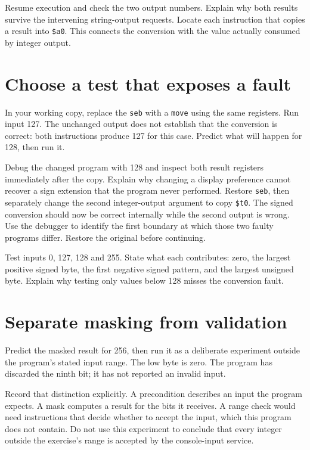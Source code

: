 Resume execution and check the two output numbers. Explain why both results
survive the intervening string-output requests. Locate each instruction that
copies a result into \texttt{\$a0}. This connects the conversion with the value
actually consumed by integer output.

\section{Choose a test that exposes a fault}

In your working copy, replace the \texttt{seb} with a \texttt{move} using the
same registers. Run input 127. The unchanged output does not establish that the
conversion is correct: both instructions produce 127 for this case. Predict what
will happen for 128, then run it.

Debug the changed program with 128 and inspect both result registers immediately
after the copy. Explain why changing a display preference cannot recover a sign
extension that the program never performed. Restore \texttt{seb}, then separately
change the second integer-output argument to copy \texttt{\$t0}. The signed
conversion should now be correct internally while the second output is wrong.
Use the debugger to identify the first boundary at which those two faulty
programs differ. Restore the original before continuing.

Test inputs 0, 127, 128 and 255. State what each contributes: zero, the largest
positive signed byte, the first negative signed pattern, and the largest unsigned
byte. Explain why testing only values below 128 misses the conversion fault.

\section{Separate masking from validation}

Predict the masked result for 256, then run it as a deliberate experiment outside
the program's stated input range. The low byte is zero. The program has discarded
the ninth bit; it has not reported an invalid input.

Record that distinction explicitly. A precondition describes an input the program
expects. A mask computes a result for the bits it receives. A range check would
need instructions that decide whether to accept the input, which this program
does not contain. Do not use this experiment to conclude that every integer
outside the exercise's range is accepted by the console-input service.

